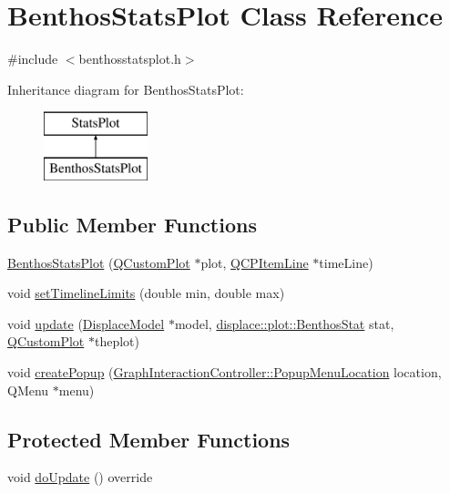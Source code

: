 \hypertarget{class_benthos_stats_plot}{}\section{Benthos\+Stats\+Plot Class Reference}
\label{class_benthos_stats_plot}


{\ttfamily \#include $<$benthosstatsplot.\+h$>$}

Inheritance diagram for Benthos\+Stats\+Plot\+:\begin{figure}[H]
\begin{center}
\leavevmode
\includegraphics[height=2.000000cm]{dd/d30/class_benthos_stats_plot}
\end{center}
\end{figure}
\subsection*{Public Member Functions}
\begin{DoxyCompactItemize}
\item 
\mbox{\hyperlink{class_benthos_stats_plot_a32497d643be6a6ae8c28697d38cb407d}{Benthos\+Stats\+Plot}} (\mbox{\hyperlink{class_q_custom_plot}{Q\+Custom\+Plot}} $\ast$plot, \mbox{\hyperlink{class_q_c_p_item_line}{Q\+C\+P\+Item\+Line}} $\ast$time\+Line)
\item 
void \mbox{\hyperlink{class_benthos_stats_plot_af4fefaf33fad2c8c42e4e9e4e9f0bc1e}{set\+Timeline\+Limits}} (double min, double max)
\item 
void \mbox{\hyperlink{class_benthos_stats_plot_a2c1b83966f578af87a58163be92411db}{update}} (\mbox{\hyperlink{class_displace_model}{Displace\+Model}} $\ast$model, \mbox{\hyperlink{namespacedisplace_1_1plot_a3a91ceda6f3e5855d0e7cf97e8dea045}{displace\+::plot\+::\+Benthos\+Stat}} stat, \mbox{\hyperlink{class_q_custom_plot}{Q\+Custom\+Plot}} $\ast$theplot)
\item 
void \mbox{\hyperlink{class_benthos_stats_plot_a57999885580483a36fde300353c17451}{create\+Popup}} (\mbox{\hyperlink{class_graph_interaction_controller_a67e6eba082927bf2b984bed54fe32764}{Graph\+Interaction\+Controller\+::\+Popup\+Menu\+Location}} location, Q\+Menu $\ast$menu)
\end{DoxyCompactItemize}
\subsection*{Protected Member Functions}
\begin{DoxyCompactItemize}
\item 
void \mbox{\hyperlink{class_benthos_stats_plot_a15bbfb2453268b8b9997ab1b794cb24f}{do\+Update}} () override
\end{DoxyCompactItemize}


